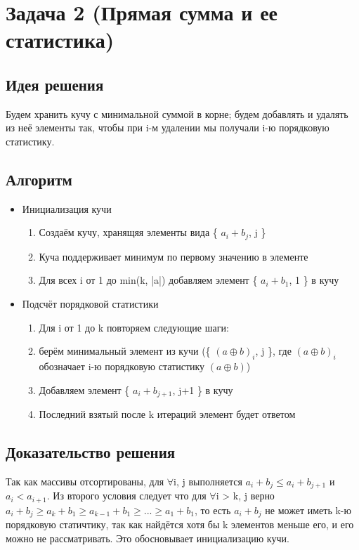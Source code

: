 \section{Задача 2 (Прямая сумма и ее статистика)}
\subsection{Идея решения}
Будем хранить кучу с минимальной суммой в корне; будем добавлять и удалять из неё элементы так, чтобы при i-м удалении мы получали i-ю порядковую статистику.

\subsection{Алгоритм}

\begin{itemize}
    \item Инициализация кучи
    \begin{enumerate}
        \item Создаём кучу, хранящяя элементы вида \{ $a_i \mathrel{+} b_j$, j \}
        \item Куча поддерживает минимум по первому значению в элементе
        \item Для всех i от 1 до min(k, |a|) добавляем элемент \{ $a_i + b_1$, 1 \} в кучу
    \end{enumerate}

    \item Подсчёт порядковой статистики
    \begin{enumerate}
        \item Для i от 1 до k повторяем следующие шаги:
        \item берём минимальный элемент из кучи (\{ $(a\oplus b)_i$, j \}, где $(a\oplus b)_i$ обозначает i-ю порядковую статистику $(a\oplus b)$)
        \item Добавляем элемент \{ $a_i + b_{j+1}$, j+1 \} в кучу
        \item Последний взятый после k итераций элемент будет ответом
    \end{enumerate}
\end{itemize}

\subsection{Доказательство решения}
Так как массивы отсортированы, для $\forall$i, j выполняется $a_i + b_j \leq a_i + b_{j+1}$ и $a_i < a_{i+1}$. Из второго условия следует что для $\forall$i > k, j верно $a_i + b_j \geq a_k + b_1 \geq a_{k-1} + b_1 \geq ... \geq a_1 + b_1$, то есть $a_i + b_j$ не может иметь k-ю порядковую статичтику, так как найдётся хотя бы k элементов меньше его, и его можно не рассматривать. Это обосновывает инициализацию кучи.

